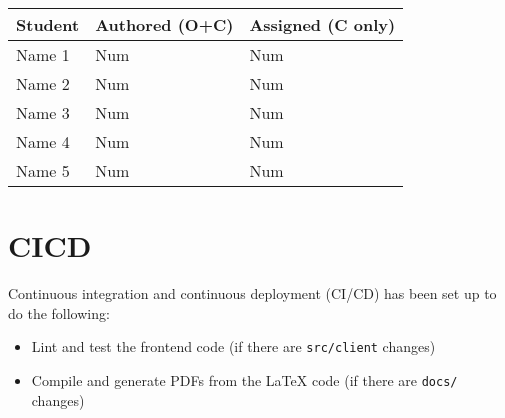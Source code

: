 \documentclass{article}
\begin{document}

\begin{table}[H]
\centering
\begin{tabular}{lll}
\toprule
\textbf{Student} & \textbf{Authored (O+C)} & \textbf{Assigned (C only)}\\
\midrule
Name 1 & Num & Num \\
Name 2 & Num & Num \\
Name 3 & Num & Num \\
Name 4 & Num & Num \\
Name 5 & Num & Num \\
\bottomrule
\end{tabular}
\end{table}




\section{CICD}

Continuous integration and continuous deployment (CI/CD) has been set up to do the following:
\begin{itemize}
    \item Lint and test the frontend code (if there are \texttt{src/client}
    changes)
    \item Compile and generate PDFs from the LaTeX code (if there are
    \texttt{docs/} changes)
\end{itemize}
\end{document}
